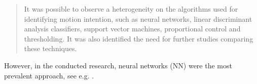 \begin{quote}
  It was possible to observe a heterogeneity on the algorithms used for identifying 
  motion intention, such as neural networks, linear discriminant analysis 
  classifiers, support vector machines, proportional control and thresholding. 
  It was also identified the need for further studies comparing these techniques.
\end{quote}

However, in the conducted research, neural networks (NN) were the most prevalent 
approach, see e.g. \cite{lu_development_2019, wu_neural-network-enhanced_2019, 
wu_adaptive_2023, sangha_compact_2016}. 
